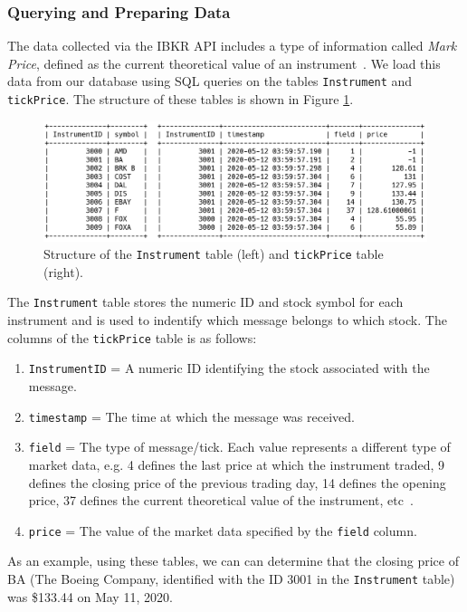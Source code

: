\documentclass[a4paper,oneside,onecolumn,12pt]{book}
\begin{document}
		\subsubsection{Querying and Preparing Data}
		The data collected via the IBKR API includes a type of information called \textit{Mark Price}, defined as the current theoretical value of an instrument~\cite{TT}. We load this data from our database using SQL queries on the tables \texttt{Instrument} and \texttt{tickPrice}. The structure of these tables is shown in Figure \ref{fig:instrument_tick_price}.
		\begin{figure}[H]
		\begin{center}
			\includegraphics[width=\linewidth]{kep/table_instrument_tick_price.png}
			\caption{Structure of the \texttt{Instrument} table (left) and \texttt{tickPrice} table (right).}
			\label{fig:instrument_tick_price}
		\end{center}
		\end{figure}
		The \texttt{Instrument} table stores the numeric ID and stock symbol for each instrument and is used to indentify which message belongs to which stock. The columns of the \texttt{tickPrice} table is as follows:
		\begin{enumerate}
			\item \texttt{InstrumentID} = A numeric ID identifying the stock associated with the message.
			\item \texttt{timestamp} = The time at which the message was received.
			\item \texttt{field} = The type of message/tick. Each value represents a different type of market data, e.g. 4 defines the last price at which the instrument traded, 9 defines the closing price of the previous trading day, 14 defines the opening price, 37 defines the current theoretical value of the instrument, etc~\cite{TT}. 
			\item \texttt{price} = The value of the market data specified by the \texttt{field} column.
		\end{enumerate}
		
		As an example, using these tables, we can can determine that the closing price of BA (The Boeing Company, identified with the ID 3001 in the \texttt{Instrument} table) was \$133.44 on May 11, 2020.
\end{document}
